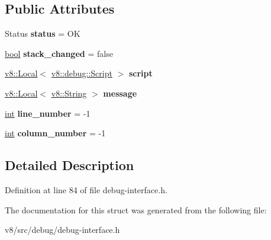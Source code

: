 \subsection*{Public Attributes}
\begin{DoxyCompactItemize}
\item 
\mbox{\label{structv8_1_1debug_1_1LiveEditResult_a86a3b95eeefb2288ae298e96b379ac22}} 
Status {\bfseries status} = OK
\item 
\mbox{\label{structv8_1_1debug_1_1LiveEditResult_a4c8690f2094ec1aa084e39eb82ae472c}} 
\mbox{\hyperlink{classbool}{bool}} {\bfseries stack\+\_\+changed} = false
\item 
\mbox{\label{structv8_1_1debug_1_1LiveEditResult_ae59445706df933146d63f135999203d5}} 
\mbox{\hyperlink{classv8_1_1Local}{v8\+::\+Local}}$<$ \mbox{\hyperlink{classv8_1_1debug_1_1Script}{v8\+::debug\+::\+Script}} $>$ {\bfseries script}
\item 
\mbox{\label{structv8_1_1debug_1_1LiveEditResult_a059bb902da1a8e8bd0a42d2adcb1cd38}} 
\mbox{\hyperlink{classv8_1_1Local}{v8\+::\+Local}}$<$ \mbox{\hyperlink{classv8_1_1String}{v8\+::\+String}} $>$ {\bfseries message}
\item 
\mbox{\label{structv8_1_1debug_1_1LiveEditResult_ae74eebc8de9f1416f58e5f0e2aed32f7}} 
\mbox{\hyperlink{classint}{int}} {\bfseries line\+\_\+number} = -\/1
\item 
\mbox{\label{structv8_1_1debug_1_1LiveEditResult_a8ab361737cf0ed727e6d02fa2676e01e}} 
\mbox{\hyperlink{classint}{int}} {\bfseries column\+\_\+number} = -\/1
\end{DoxyCompactItemize}


\subsection{Detailed Description}


Definition at line 84 of file debug-\/interface.\+h.



The documentation for this struct was generated from the following file\+:\begin{DoxyCompactItemize}
\item 
v8/src/debug/debug-\/interface.\+h\end{DoxyCompactItemize}
